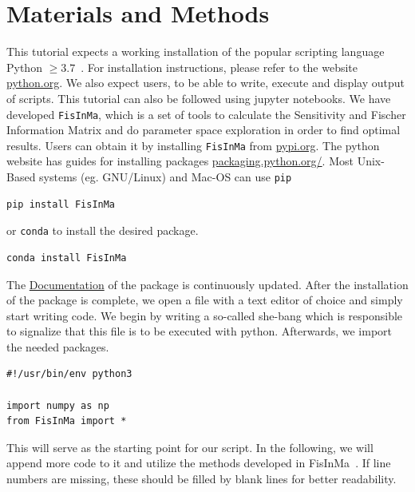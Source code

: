 \documentclass[10pt,A4paper]{article}
\begin{document}
\section*{Materials and Methods}
This tutorial expects a working installation of the popular scripting language Python $\geq3.7$~\cite{rossumPythonLanguageReference2010}.
For installation instructions, please refer to the website \href{https://www.python.org/downloads/}{python.org}.
We also expect users, to be able to write, execute and display output of scripts.
This tutorial can also be followed using jupyter notebooks.
We have developed \texttt{FisInMa}, which is a set of tools to calculate the Sensitivity and Fischer Information Matrix and do parameter space exploration in order to find optimal results.
Users can obtain it by installing \texttt{FisInMa} from \href{https://pypi.org/project/FisInMa/0.0.1/}{pypi.org}.
The python website has guides for installing packages \href{https://packaging.python.org/en/latest/tutorials/installing-packages/}{packaging.python.org/}.
Most Unix-Based systems (eg. GNU/Linux) and Mac-OS can use \texttt{pip}
\begin{verbatim}
pip install FisInMa
\end{verbatim}
or \texttt{conda} to install the desired package.
\begin{verbatim}
conda install FisInMa
\end{verbatim}
The \href{https://spatial-systems-biology-freiburg.github.io/FisInMa/}{Documentation} of the package is continuously updated.
After the installation of the package is complete, we open a file with a text editor of choice and simply start writing code.
We begin by writing a so-called she-bang which is responsible to signalize that this file is to be executed with python.
Afterwards, we import the needed packages.
\begin{verbatim}
#!/usr/bin/env python3

import numpy as np
from FisInMa import *
\end{verbatim}
This will serve as the starting point for our script.
In the following, we will append more code to it and utilize the methods developed in FisInMa~\cite{}.%
If line numbers are missing, these should be filled by blank lines for better readability.
%
%
\end{document}
